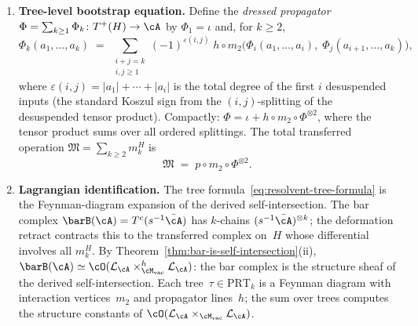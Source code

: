\begin{theorem}
\begin{enumerate}[label=\textup{(\roman*)}]
\item \textbf{Tree-level bootstrap equation.}
 Define the \emph{dressed propagator}\/
 $\Phi = \sum_{k \geq 1} \Phi_k\colon T^+(H) \to \cA$ by
 $\Phi_1 = \iota$ and, for $k \geq 2$,
 \begin{equation}
 \label{eq:dressed-propagator}
 \Phi_k(a_1, \ldots, a_k)
 \;=\;
 \sum_{\substack{i+j = k \\ i,j \geq 1}}
 (-1)^{\varepsilon(i,j)}\;
 h \circ m_2\bigl(
 \Phi_i(a_1, \ldots, a_i),\;
 \Phi_j(a_{i+1}, \ldots, a_k)
 \bigr),
 \end{equation}
 where $\varepsilon(i,j) = |a_1| + \cdots + |a_i|$ is the total degree
 of the first $i$ desuspended inputs (the standard Koszul sign from the
 $(i,j)$-splitting of the desuspended tensor product).
 Compactly: $\Phi = \iota + h \circ m_2 \circ \Phi^{\otimes 2}$,
 where the tensor product sums over all ordered splittings.
 The total transferred operation
 $\mathfrak{M} = \sum_{k \geq 2} m_k^H$ is
 \begin{equation}
 \label{eq:chiral-dyson-schwinger}
 \mathfrak{M}
 \;=\;
 p \circ m_2 \circ \Phi^{\otimes 2}.
 \end{equation}

\item \textbf{Lagrangian identification.}
 The tree formula~\eqref{eq:resolvent-tree-formula} is the
 Feynman-diagram expansion of the derived self-intersection.
 The bar complex\/ $\barB(\cA) = T^c(s^{-1}\bar{\cA})$
 has $k$-chains $(s^{-1}\bar{\cA})^{\otimes k}$;
 the deformation retract
 contracts this to the transferred complex on~$H$ whose
 differential involves all\/ $m_k^H$.
 By Theorem~\textup{\ref{thm:bar-is-self-intersection}}\textup{(ii)},
 $\barB(\cA) \simeq \cO(\cL_\cA \times_{\Mvac}^h \cL_\cA)$:
 the bar complex is the structure sheaf of the derived
 self-intersection.
 Each tree~$\tau \in \mathrm{PRT}_k$ is a Feynman diagram
 with interaction vertices~$m_2$ and propagator lines~$h$;
 the sum over trees computes the structure constants of\/
 $\cO(\cL_\cA \times_{\Mvac} \cL_\cA)$.
\end{enumerate}
\end{theorem}

